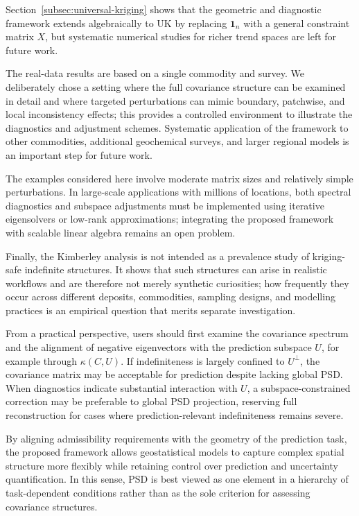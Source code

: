 \documentclass[smallextended]{svjour3}
\newcommand{\1}{\mathbf{1}}
\begin{document}
 Section~\ref{subsec:universal-kriging} shows that the geometric and diagnostic framework extends algebraically to UK by replacing $\mathbf{1}_n$ with a general constraint matrix $X$, but systematic numerical studies for richer trend spaces are left for future work.

The real-data results are based on a single commodity and survey. We deliberately chose a setting where the full covariance structure can be examined in detail and where targeted perturbations can mimic boundary, patchwise, and local inconsistency effects; this provides a controlled environment to illustrate the diagnostics and adjustment schemes. Systematic application of the framework to other commodities, additional geochemical
surveys, and larger regional models is an important step for future work.

The examples considered here involve moderate matrix sizes and relatively simple perturbations. In large-scale applications with millions of locations, both spectral diagnostics and subspace adjustments must be implemented using iterative eigensolvers or low-rank approximations; integrating the proposed framework with scalable linear algebra remains an open problem.

Finally, the Kimberley analysis is not intended as a prevalence study of kriging-safe indefinite structures. It shows that such structures can arise in realistic workflows and are therefore not merely synthetic curiosities; how frequently they occur across different deposits, commodities, sampling designs, and modelling practices is an empirical question that merits separate investigation.

From a practical perspective, users should first examine the covariance spectrum and the alignment of negative eigenvectors with the prediction subspace $U$, for example through $\kappa(C,U)$. If indefiniteness is largely confined to $U^\perp$, the covariance matrix may be acceptable for prediction despite lacking global PSD. When diagnostics indicate
substantial interaction with $U$, a subspace-constrained correction may be preferable to global PSD projection, reserving full reconstruction for cases where prediction-relevant indefiniteness remains severe.

By aligning admissibility requirements with the geometry of the prediction task, the proposed framework allows geostatistical models to capture complex spatial structure more flexibly while retaining control over prediction and uncertainty quantification. In this sense, PSD is best viewed as one element in a hierarchy of task-dependent conditions rather than as the sole criterion for assessing covariance structures. 
\end{document}
